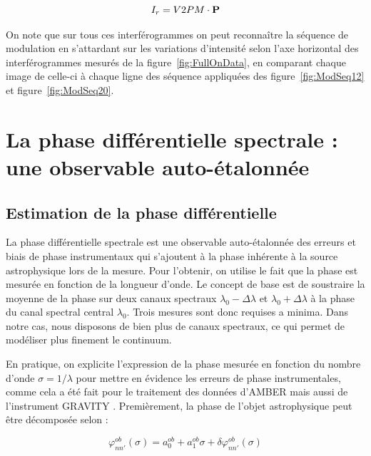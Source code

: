 \begin{equation}
    I_r = V2PM \cdot \text{\textbf{P}} \label{eq:FullOnFit}
\end{equation}

On note que sur tous ces interférogrammes on peut reconnaître la séquence de modulation en s'attardant sur les variations d'intensité selon l'axe horizontal des interférogrammes mesurés de la figure~\ref{fig:FullOnData}, en comparant chaque image de celle-ci à chaque ligne des séquence appliquées des figure~\ref{fig:ModSeq12} et figure~\ref{fig:ModSeq20}.


\section{La phase différentielle spectrale : une observable auto-étalonnée}
\label{sec:PhaseSpecDiff}

\subsection{Estimation de la phase différentielle}

La phase différentielle spectrale est une observable auto-étalonnée des erreurs et biais de phase instrumentaux qui s'ajoutent à la phase inhérente à la source astrophysique lors de la mesure. Pour l'obtenir, on utilise le fait que la phase est mesurée en fonction de la longueur d'onde. Le concept de base \citep{buscher2015} est de soustraire la moyenne de la phase sur deux canaux spectraux $\lambda_0 - \Delta\lambda$ et $\lambda_0 + \Delta\lambda$ à la phase du canal spectral central $\lambda_0$. Trois mesures sont donc requises a minima. Dans notre cas, nous disposons de bien plus de canaux spectraux, ce qui permet de modéliser plus finement le continuum.

En pratique, on explicite l'expression de la phase mesurée en fonction du nombre d'onde $\sigma = 1 / \lambda$ pour mettre en évidence les erreurs de phase instrumentales, comme cela a été fait pour le traitement des données d'\ac{AMBER} \citep{millour2008} mais aussi de l'instrument \ac{GRAVITY} \citep{lapeyrere2014}. Premièrement, la phase de l'objet astrophysique peut être décomposée selon :

\begin{equation}
    \varphi^{ob}_{nn'}(\sigma) = a^{ob}_0 + a^{ob}_1 \sigma + \delta\varphi^{ob}_{nn'}(\sigma) \label{eq:PhaseSource}
\end{equation}

